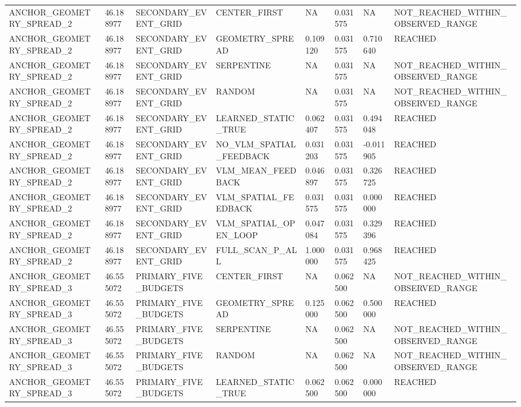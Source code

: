\begin{tabular}{llllllll}
ANCHOR\_GEOMETRY\_SPREAD\_2 & 46.188977 & SECONDARY\_EVENT\_GRID & CENTER\_FIRST & NA & 0.031575 & NA & NOT\_REACHED\_WITHIN\_OBSERVED\_RANGE \\
ANCHOR\_GEOMETRY\_SPREAD\_2 & 46.188977 & SECONDARY\_EVENT\_GRID & GEOMETRY\_SPREAD & 0.109120 & 0.031575 & 0.710640 & REACHED \\
ANCHOR\_GEOMETRY\_SPREAD\_2 & 46.188977 & SECONDARY\_EVENT\_GRID & SERPENTINE & NA & 0.031575 & NA & NOT\_REACHED\_WITHIN\_OBSERVED\_RANGE \\
ANCHOR\_GEOMETRY\_SPREAD\_2 & 46.188977 & SECONDARY\_EVENT\_GRID & RANDOM & NA & 0.031575 & NA & NOT\_REACHED\_WITHIN\_OBSERVED\_RANGE \\
ANCHOR\_GEOMETRY\_SPREAD\_2 & 46.188977 & SECONDARY\_EVENT\_GRID & LEARNED\_STATIC\_TRUE & 0.062407 & 0.031575 & 0.494048 & REACHED \\
ANCHOR\_GEOMETRY\_SPREAD\_2 & 46.188977 & SECONDARY\_EVENT\_GRID & NO\_VLM\_SPATIAL\_FEEDBACK & 0.031203 & 0.031575 & -0.011905 & REACHED \\
ANCHOR\_GEOMETRY\_SPREAD\_2 & 46.188977 & SECONDARY\_EVENT\_GRID & VLM\_MEAN\_FEEDBACK & 0.046897 & 0.031575 & 0.326725 & REACHED \\
ANCHOR\_GEOMETRY\_SPREAD\_2 & 46.188977 & SECONDARY\_EVENT\_GRID & VLM\_SPATIAL\_FEEDBACK & 0.031575 & 0.031575 & 0.000000 & REACHED \\
ANCHOR\_GEOMETRY\_SPREAD\_2 & 46.188977 & SECONDARY\_EVENT\_GRID & VLM\_SPATIAL\_OPEN\_LOOP & 0.047084 & 0.031575 & 0.329396 & REACHED \\
ANCHOR\_GEOMETRY\_SPREAD\_2 & 46.188977 & SECONDARY\_EVENT\_GRID & FULL\_SCAN\_P\_ALL & 1.000000 & 0.031575 & 0.968425 & REACHED \\
ANCHOR\_GEOMETRY\_SPREAD\_3 & 46.555072 & PRIMARY\_FIVE\_BUDGETS & CENTER\_FIRST & NA & 0.062500 & NA & NOT\_REACHED\_WITHIN\_OBSERVED\_RANGE \\
ANCHOR\_GEOMETRY\_SPREAD\_3 & 46.555072 & PRIMARY\_FIVE\_BUDGETS & GEOMETRY\_SPREAD & 0.125000 & 0.062500 & 0.500000 & REACHED \\
ANCHOR\_GEOMETRY\_SPREAD\_3 & 46.555072 & PRIMARY\_FIVE\_BUDGETS & SERPENTINE & NA & 0.062500 & NA & NOT\_REACHED\_WITHIN\_OBSERVED\_RANGE \\
ANCHOR\_GEOMETRY\_SPREAD\_3 & 46.555072 & PRIMARY\_FIVE\_BUDGETS & RANDOM & NA & 0.062500 & NA & NOT\_REACHED\_WITHIN\_OBSERVED\_RANGE \\
ANCHOR\_GEOMETRY\_SPREAD\_3 & 46.555072 & PRIMARY\_FIVE\_BUDGETS & LEARNED\_STATIC\_TRUE & 0.062500 & 0.062500 & 0.000000 & REACHED \\

\end{tabular}
